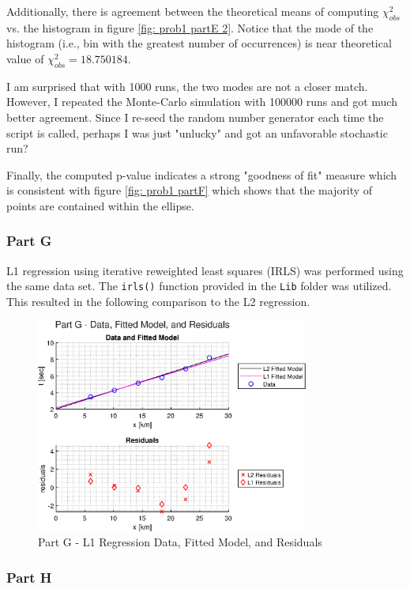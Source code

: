 Additionally, there is agreement between the theoretical means of computing $\chi^2_{obs}$ vs. the histogram in figure \ref{fig: prob1 partE 2}. Notice that the mode of the histogram (i.e., bin with the greatest number of occurrences) is near theoretical value of $\chi^2_{obs} = \textrm{18.750184}$. 

I am surprised that with 1000 runs, the two modes are not a closer match. However, I repeated the Monte-Carlo simulation with 100000 runs and got much better agreement. Since I re-seed the random number generator each time the script is called, perhaps I was just "unlucky" and got an unfavorable stochastic run?

Finally, the computed p-value indicates a strong "goodness of fit" measure which is consistent with figure \ref{fig: prob1 partF} which shows that the majority of points are contained within the ellipse. 


\subsubsection{Part G}

L1 regression using iterative reweighted least squares (IRLS) was performed using the same data set. The \verb|irls()| function provided in the \verb|Lib| folder was utilized. This resulted in the following comparison to the L2 regression. 

\begin{figure}[h] 
	\centering
	\includegraphics[width=0.8\textwidth]{./images/prob1_partG.eps}
	\caption{Part G - L1 Regression Data, Fitted Model, and Residuals}
	\label{fig: prob1 partG}
\end{figure}
\FloatBarrier


\subsubsection{Part H}

